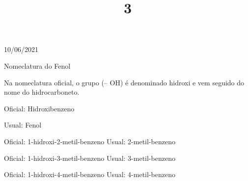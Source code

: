 \documentclass{SchoolBook}
\begin{document}
\begin{day}{10/06/2021}
        \title{3}{Nomeclatura do Fenol}
        
        Na nomeclatura oficial, o grupo (-- OH) é denominado hidroxi e vem seguido do nome do hidrocarboneto.
        
         Oficial: Hidroxibenzeno
        
         Usual: Fenol
        
        Oficial: 1-hidroxi-2-metil-benzeno
        Usual: 2-metil-benzeno
        
        Oficial: 1-hidroxi-3-metil-benzeno
        Usual: 3-metil-benzeno
        
        Oficial: 1-hidroxi-4-metil-benzeno
        Usual: 4-metil-benzeno
    \end{day}
\end{document}
